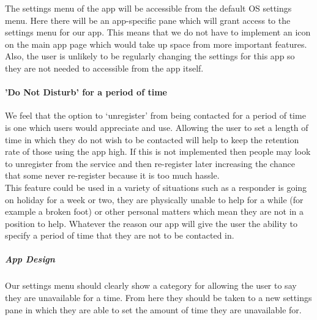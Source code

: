 \documentclass{article}
\begin{document}
The settings menu of the app will be accessible from the default OS settings menu. Here there will be an app-specific pane which will grant access to the settings menu for our app. This means that we do not have to implement an icon on the main app page which would take up space from more important features. Also, the user is unlikely to be regularly changing the settings for this app so they are not needed to accessible from the app itself.

\paragraph{'Do Not Disturb' for a period of time}
We feel that the option to ‘unregister’ from being contacted for a period of time is one which users would appreciate and use. Allowing the user to set a length of time in which they do not wish to be contacted will help to keep the retention rate of those using the app high. If this is not implemented then people may look to unregister from the service and then re-register later increasing the chance that some never re-register because it is too much hassle.\\

This feature could be used in a variety of situations such as a responder is going on holiday for a week or two, they are physically unable to help for a while (for example a broken foot) or other personal matters which mean they are not in a position to help. Whatever the reason our app will give the user the ability to specify a period of time that they are not to be contacted in.

\subparagraph{App Design}
Our settings menu should clearly show a category for allowing the user to say they are unavailable for a time. From here they should be taken to a new settings pane in which they are able to set the amount of time they are unavailable for. \\
\end{document}
